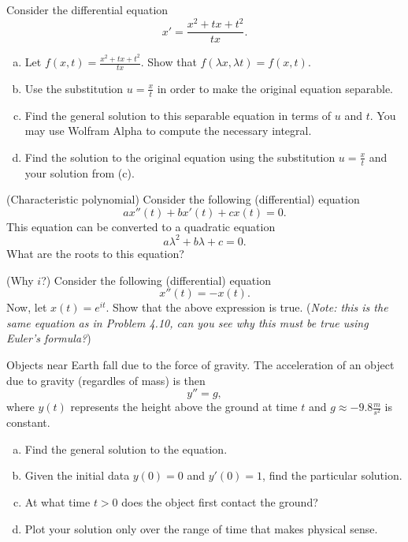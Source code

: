 \begin{problem}
    Consider the differential equation
    \[
    x'=\frac{x^2+tx+t^2}{tx}.
    \]
    \begin{enumerate}[(a)]
        \item Let $f(x,t)=\frac{x^2+tx+t^2}{tx}$.  Show that $f(\lambda x, \lambda t)=f(x,t)$.
        \item Use the substitution $u=\frac{x}{t}$ in order to make the original equation separable.
        \item Find the general solution to this separable equation in terms of $u$ and $t$. You may use Wolfram Alpha to compute the necessary integral.
        \item Find the solution to the original equation using the substitution $u=\frac{x}{t}$ and your solution from (c).
    \end{enumerate}
\end{problem}

\begin{problem}
(Characteristic polynomial) Consider the following (differential) equation
\[
ax''(t)+bx'(t)+cx(t)=0.
\]
This equation can be converted to a quadratic equation
\[
a\lambda^2 + b\lambda + c = 0.
\]
What are the roots to this equation?
\end{problem}

\begin{problem}
(Why $i$?) Consider the following (differential) equation
\[
x''(t)=-x(t).
\]
Now, let $x(t)=e^{it}$.  Show that the above expression is true. (\emph{Note: this is the same equation as in Problem 4.10, can you see why this must be true using Euler's formula?})
\end{problem}

\begin{problem}
Objects near Earth fall due to the force of gravity.  The acceleration of an object due to gravity (regardles of mass) is then
\[
y''=g,
\]
where $y(t)$ represents the height above the ground at time $t$ and $g\approx -9.8\frac{m}{s^2}$ is constant.
\begin{enumerate}[(a)]
    \item Find the general solution to the equation.
    \item Given the initial data $y(0)=0$ and $y'(0)=1$, find the particular solution.
    \item At what time $t>0$ does the object first contact the ground?
    \item Plot your solution only over the range of time that makes physical sense.
\end{enumerate}
\end{problem}

